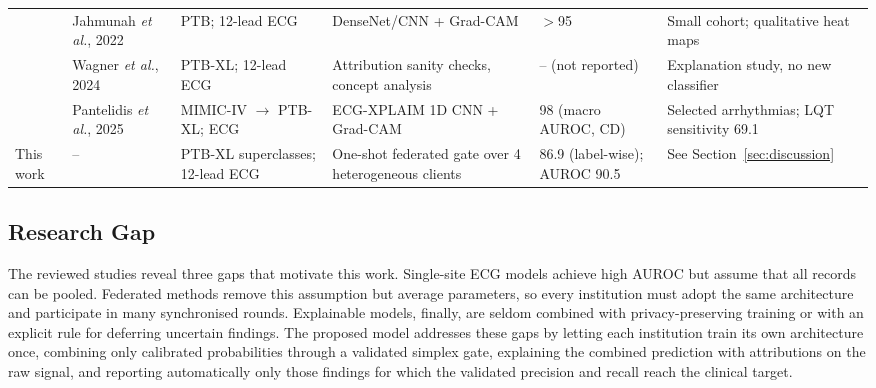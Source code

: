 \begin{table}[!t]
\begin{tabular}{@{}p{0.6cm}p{2.4cm}p{3.1cm}p{3.6cm}p{2.0cm}p{4.8cm}@{}}
\cite{jahmunah2022gradcam} & Jahmunah \textit{et al.}, 2022 & PTB; 12-lead ECG & DenseNet/CNN + Grad-CAM & $>$95 & Small cohort; qualitative heat maps \\
\cite{wagner2024xai} & Wagner \textit{et al.}, 2024 & PTB-XL; 12-lead ECG & Attribution sanity checks, concept analysis & -- (not reported) & Explanation study, no new classifier \\
\cite{pantelidis2025xplaim} & Pantelidis \textit{et al.}, 2025 & MIMIC-IV $\rightarrow$ PTB-XL; ECG & ECG-XPLAIM 1D CNN + Grad-CAM & 98 (macro AUROC, CD) & Selected arrhythmias; LQT sensitivity 69.1 \\
\midrule
This work & -- & PTB-XL superclasses; 12-lead ECG & One-shot federated gate over 4 heterogeneous clients & 86.9 (label-wise); AUROC 90.5 & See Section~\ref{sec:discussion} \\
\bottomrule
\end{tabular}
\end{table}

\subsection{Research Gap}
The reviewed studies reveal three gaps that motivate this work. Single-site ECG models achieve high
AUROC but assume that all records can be pooled. Federated methods remove this assumption but
average parameters, so every institution must adopt the same architecture and participate in many
synchronised rounds. Explainable models, finally, are seldom combined with privacy-preserving
training or with an explicit rule for deferring uncertain findings. The proposed model addresses
these gaps by letting each institution train its own architecture once, combining only calibrated
probabilities through a validated simplex gate, explaining the combined prediction with
attributions on the raw signal, and reporting automatically only those findings for which the
validated precision and recall reach the clinical target.
